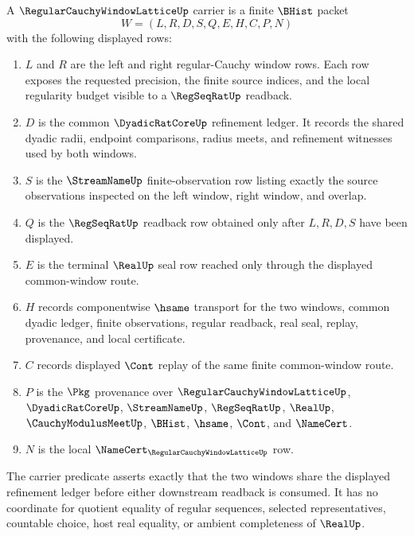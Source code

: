 \begin{definition}
\label{def:regular-cauchy-window-lattice-carrier}
A $\RegularCauchyWindowLatticeUp$ carrier is a finite $\BHist$ packet
$$
W=(L,R,D,S,Q,E,H,C,P,N)
$$
with the following displayed rows:
\begin{enumerate}
\item $L$ and $R$ are the left and right regular-Cauchy window rows. Each row exposes the requested precision, the finite source indices, and the local regularity budget visible to a $\RegSeqRatUp$ readback.
\item $D$ is the common $\DyadicRatCoreUp$ refinement ledger. It records the shared dyadic radii, endpoint comparisons, radius meets, and refinement witnesses used by both windows.
\item $S$ is the $\StreamNameUp$ finite-observation row listing exactly the source observations inspected on the left window, right window, and overlap.
\item $Q$ is the $\RegSeqRatUp$ readback row obtained only after $L,R,D,S$ have been displayed.
\item $E$ is the terminal $\RealUp$ seal row reached only through the displayed common-window route.
\item $H$ records componentwise $\hsame$ transport for the two windows, common dyadic ledger, finite observations, regular readback, real seal, replay, provenance, and local certificate.
\item $C$ records displayed $\Cont$ replay of the same finite common-window route.
\item $P$ is the $\Pkg$ provenance over $\RegularCauchyWindowLatticeUp$, $\DyadicRatCoreUp$, $\StreamNameUp$, $\RegSeqRatUp$, $\RealUp$, $\CauchyModulusMeetUp$, $\BHist$, $\hsame$, $\Cont$, and $\NameCert$.
\item $N$ is the local $\NameCert_{\RegularCauchyWindowLatticeUp}$ row.
\end{enumerate}
The carrier predicate asserts exactly that the two windows share the displayed refinement ledger before either downstream readback is consumed. It has no coordinate for quotient equality of regular sequences, selected representatives, countable choice, host real equality, or ambient completeness of $\RealUp$.
\end{definition}

